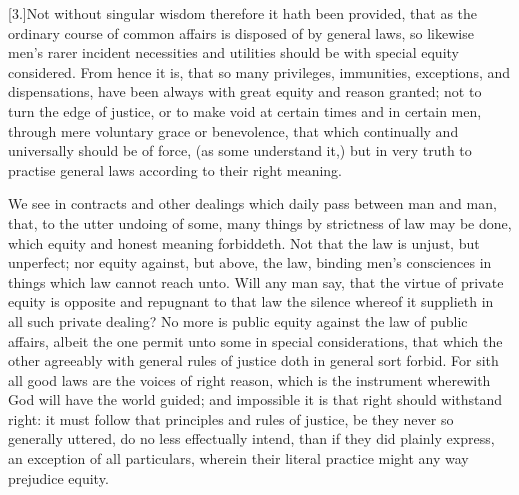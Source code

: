 [3.]Not without singular wisdom therefore it hath been provided, that as the ordinary course of common affairs is disposed of by general laws, so likewise men’s rarer incident necessities and utilities should be with special equity considered. From hence it is, that so many privileges, immunities, exceptions, and dispensations, have been always with great equity and reason granted; not to turn the edge of justice, or to make void at certain times and in certain men, through mere voluntary grace or benevolence, that which continually and universally should be of force, (as some understand it,) but in very truth to practise general laws according to their right meaning.

We see in contracts and other dealings which daily pass between man and man, that, to the utter undoing of some, many things by strictness of law may be done, which equity and honest meaning forbiddeth. Not that the law is unjust, but unperfect; nor equity against, but above, the law, binding men’s consciences in things which law cannot reach unto. Will any man say, that the virtue of private equity is opposite and repugnant to that law the silence whereof it supplieth in all such private dealing? No more is public equity against the law of public affairs, albeit the one permit unto some in special considerations, that which the other  agreeably with general rules of justice doth in general sort forbid.
 For sith all good laws are the voices of right reason, which is the instrument wherewith God will have the world guided; and impossible it is that right should withstand right: it must follow that principles and rules of justice, be they never so generally uttered, do no less effectually intend, than if they did plainly express, an exception of all particulars, wherein their literal practice might any way prejudice equity.

